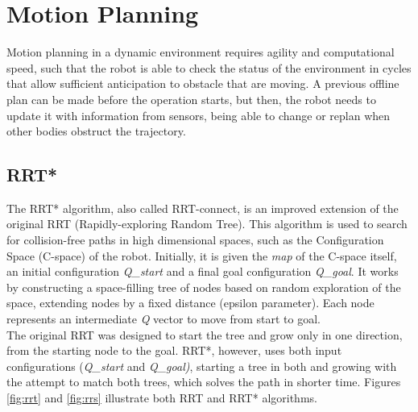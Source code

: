 \section{Motion Planning}
\label{sec:plan}
Motion planning in a dynamic environment requires agility and computational speed, such that the robot is able to check the status of the environment in cycles that allow sufficient anticipation to obstacle that are moving. A previous offline plan can be made before the operation starts, but then, the robot needs to update it with information from sensors, being able to change or replan when other bodies obstruct the trajectory.

\subsection{RRT*}
\label{sec:rrt}
The RRT* algorithm, also called RRT-connect, is an improved extension of the original RRT (Rapidly-exploring Random Tree). This algorithm is used to search for collision-free paths in high dimensional spaces, such as the Configuration Space (C-space) of the robot. Initially, it is given the \textit{map} of the C-space itself, an initial configuration \textit{Q\_start} and a final goal configuration \textit{Q\_goal}. It works by constructing a space-filling tree of nodes based on random exploration of the space, extending nodes by a fixed distance (epsilon parameter). Each node represents an intermediate \textit{Q} vector to move from start to goal. \\

The original RRT was designed to start the tree and grow only in one direction, from the starting node to the goal. RRT*, however, uses both input configurations (\textit{Q\_start} and \textit{Q\_goal)}, starting a tree in both and growing with the attempt to match both trees, which solves the path in shorter time. Figures \ref{fig:rrt} and \ref{fig:rrs} illustrate both RRT and RRT* algorithms.\\

